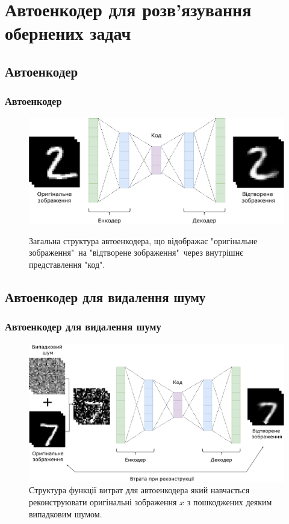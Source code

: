 \documentclass{beamer}
\numberwithin{equation}{section}
\newcounter{e}
\numberwithin{equation}{section}
\numberwithin{figure}{section}
\begin{document}
	\section{Автоенкодер для розв'язування обернених задач}
	\subsection{Автоенкодер}
	\begin{frame}
		\frametitle{Автоенкодер}
		
		\begin{figure}[H]
			\centering
			\includegraphics[width=1\textwidth]{../resources/autoencoder.pdf}
			\label{fig:autoencoder}
			\caption{Загальна структура автоенкодера, що відображає "оригінальне зображення"\ на "відтворене зображення"\ через внутрішнє представлення "код". }
		\end{figure}
	\end{frame}

	\subsection{Автоенкодер для видалення шуму}
	\begin{frame}
		\frametitle{Автоенкодер для видалення шуму}
		
		\begin{figure}[H]
			\centering
			\includegraphics[width=1\textwidth]{../resources/dae.pdf}
			\caption{
				Структура функції витрат для автоенкодера який навчається реконструювати оригінальні зображення $x$ з пошкоджених деяким випадковим шумом.}
			\label{fig:danoising-autoencoder}
		\end{figure}
	\end{frame}
\end{document}

